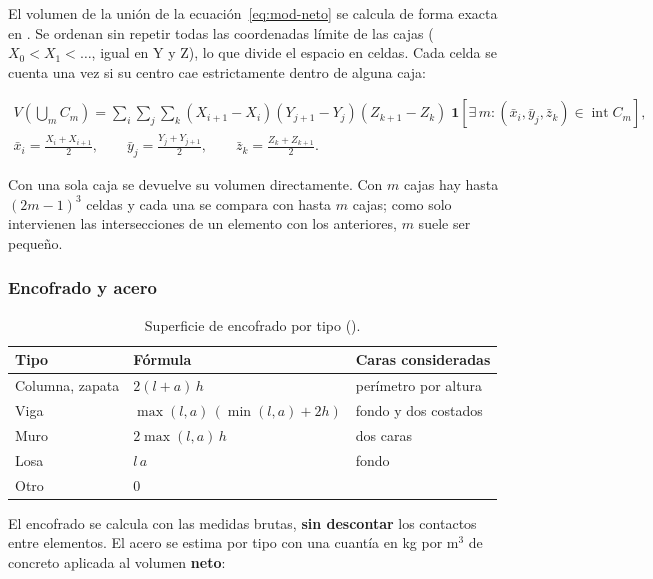 El volumen de la unión de la ecuación~\eqref{eq:mod-neto} se calcula de forma exacta en
. Se ordenan sin repetir todas las coordenadas límite de las cajas
($X_0 < X_1 < \dots$, igual en Y y Z), lo que divide el espacio en celdas. Cada celda se cuenta una vez si su centro
cae estrictamente dentro de alguna caja:

\begin{gather}
	V\!\left(\textstyle\bigcup_m C_m\right) = \sum_{i}\sum_{j}\sum_{k} (X_{i+1}-X_i)(Y_{j+1}-Y_j)(Z_{k+1}-Z_k)\;
	\mathbf{1}\!\left[ \exists\, m : (\bar{x}_i, \bar{y}_j, \bar{z}_k) \in \operatorname{int} C_m \right], \\
	\bar{x}_i = \tfrac{X_i + X_{i+1}}{2}, \qquad \bar{y}_j = \tfrac{Y_j + Y_{j+1}}{2}, \qquad \bar{z}_k = \tfrac{Z_k + Z_{k+1}}{2}.
\end{gather}

Con una sola caja se devuelve su volumen directamente. Con $m$ cajas hay hasta $(2m-1)^3$ celdas y cada una se compara
con hasta $m$ cajas; como solo intervienen las intersecciones de un elemento con los anteriores, $m$ suele ser pequeño.

\subsubsection{Encofrado y acero}

\begin{table}[H]
	\centering
	\caption{Superficie de encofrado por tipo ().}
	\label{tab:mod-encofrado}
	\begin{tabular}{L{2.6cm}L{4.6cm}L{6.4cm}}
		\hline
		\textbf{Tipo} & \textbf{Fórmula} & \textbf{Caras consideradas} \\ \hline
		Columna, zapata & $2(l + a)\,h$ & perímetro por altura \\
		Viga & $\max(l,a)\,\left(\min(l,a) + 2h\right)$ & fondo y dos costados \\
		Muro & $2\max(l,a)\,h$ & dos caras \\
		Losa & $l\,a$ & fondo \\
		Otro & 0 & \\
		\hline
	\end{tabular}
\end{table}

El encofrado se calcula con las medidas brutas, \textbf{sin descontar} los contactos entre elementos. El acero se
estima por tipo con una cuantía en kg por m$^3$ de concreto aplicada al volumen \textbf{neto}:

